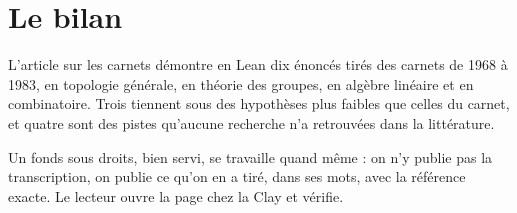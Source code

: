 \section{Le bilan}

L'article sur les carnets démontre en Lean dix énoncés tirés des carnets de 1968 à 1983, en topologie
générale, en théorie des groupes, en algèbre linéaire et en combinatoire. Trois tiennent
sous des hypothèses plus faibles que celles du carnet, et quatre sont des pistes qu'aucune
recherche n'a retrouvées dans la littérature.

\begin{exemple}
Un fonds sous droits, bien servi, se travaille quand même : on n'y publie pas la
transcription, on publie ce qu'on en a tiré, dans ses mots, avec la référence exacte. Le
lecteur ouvre la page chez la Clay et vérifie.
\end{exemple}
